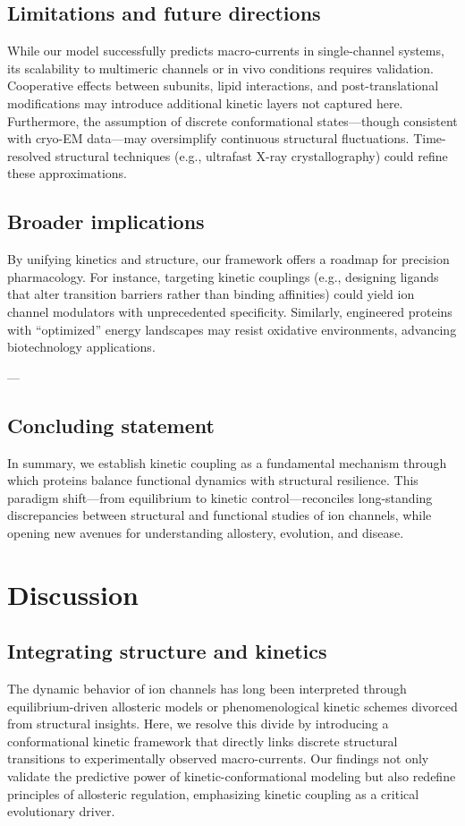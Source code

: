 \documentclass[a4paper,12pt]{article}
\begin{document}
	\subsection{Limitations and future directions}
	While our model successfully predicts macro-currents in single-channel systems, its scalability to multimeric channels or in vivo conditions requires validation. Cooperative effects between subunits, lipid interactions, and post-translational modifications may introduce additional kinetic layers not captured here. Furthermore, the assumption of discrete conformational states—though consistent with cryo-EM data—may oversimplify continuous structural fluctuations. Time-resolved structural techniques (e.g., ultrafast X-ray crystallography) could refine these approximations.  
	
	\subsection{Broader implications} 
	By unifying kinetics and structure, our framework offers a roadmap for precision pharmacology. For instance, targeting kinetic couplings (e.g., designing ligands that alter transition barriers rather than binding affinities) could yield ion channel modulators with unprecedented specificity. Similarly, engineered proteins with “optimized” energy landscapes may resist oxidative environments, advancing biotechnology applications.  
	
	---
	
	\subsection{Concluding statement}  
	In summary, we establish kinetic coupling as a fundamental mechanism through which proteins balance functional dynamics with structural resilience. This paradigm shift—from equilibrium to kinetic control—reconciles long-standing discrepancies between structural and functional studies of ion channels, while opening new avenues for understanding allostery, evolution, and disease.  
	
	\section{Discussion}
	
	\subsection*{Integrating structure and kinetics}
	The dynamic behavior of ion channels has long been interpreted through equilibrium-driven allosteric models or phenomenological kinetic schemes divorced from structural insights. Here, we resolve this divide by introducing a conformational kinetic framework that directly links discrete structural transitions to experimentally observed macro-currents. Our findings not only validate the predictive power of kinetic-conformational modeling but also redefine principles of allosteric regulation, emphasizing kinetic coupling as a critical evolutionary driver. 
	
\end{document}
